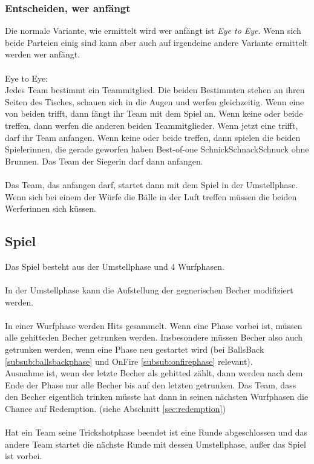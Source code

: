 \documentclass[a5paper, 12pt]{book}
\begin{document}
\subsubsection{Entscheiden, wer anfängt}\label{subsub:entscheidenweranfängt}
Die normale Variante, wie ermittelt wird wer anfängt ist \textit{Eye to Eye}. Wenn sich beide Parteien einig sind kann aber auch auf irgendeine andere Variante ermittelt werden wer anfängt. \\\\
Eye to Eye:\\
Jedes Team bestimmt ein Teammitglied. Die beiden Bestimmten stehen an ihren Seiten des Tisches, schauen sich in die Augen und werfen gleichzeitig. Wenn eine von beiden trifft, dann fängt ihr Team mit dem Spiel an. Wenn keine oder beide treffen, dann werfen die anderen beiden Teammitglieder. Wenn jetzt eine trifft, darf ihr Team anfangen. Wenn keine oder beide treffen, dann spielen die beiden Spielerinnen, die gerade geworfen haben Best-of-one SchnickSchnackSchnuck ohne Brunnen. Das Team der Siegerin darf dann anfangen. \\\\Das Team, das anfangen darf, startet dann mit dem Spiel in der Umstellphase.\\
Wenn sich bei einem der Würfe die Bälle in der Luft treffen müssen die beiden Werferinnen sich küssen.
\subsection{Spiel}\label{sub:spiel}
Das Spiel besteht aus der Umstellphase und 4 Wurfphasen. \\\\
In der Umstellphase kann die Aufstellung der gegnerischen Becher modifiziert werden. \\\\
In einer Wurfphase werden Hits gesammelt. Wenn eine Phase vorbei ist, müssen alle gehitteden Becher getrunken werden. Insbesondere müssen Becher also auch getrunken werden, wenn eine Phase neu gestartet wird (bei BallsBack \ref{subsub:ballsbackphase} und OnFire \ref{subsub:onfirephase} relevant).\\
 Ausnahme ist, wenn der letzte Becher als gehitted zählt, dann werden nach dem Ende der Phase nur alle Becher bis auf den letzten getrunken. Das Team, dass den Becher eigentlich trinken müsste hat dann in seinen nächsten Wurfphasen die Chance auf Redemption. (siehe Abschnitt \ref{sec:redemption})\\\\
Hat ein Team seine Trickshotphase beendet ist eine Runde abgeschlossen und das andere Team startet die nächste Runde mit dessen Umstellphase, außer das Spiel ist vorbei.\\\\
\end{document}
